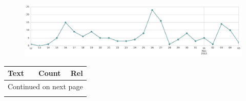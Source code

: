 \begin{figure}[htbp!]
    \centering
    \includegraphics[width=\textwidth]{twitter_all/report_images/topic-37-timeseries.jpg}
\end{figure}

\begin{longtable}{p{12.5cm}rr}
\toprule
Text & Count & Rel \\
\midrule
\endhead
\midrule
\multicolumn{3}{r}{{Continued on next page}} \\
\midrule
\endfoot


\end{longtable}
